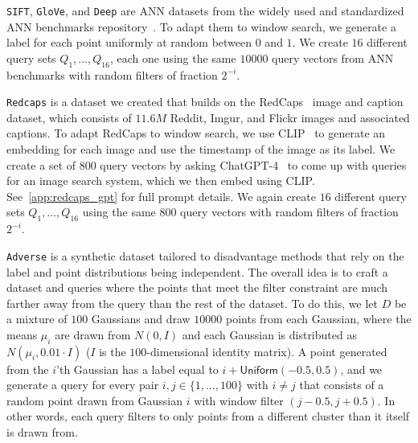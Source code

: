 \documentclass{article}
\theoremstyle{plain}
\theoremstyle{definition}
\theoremstyle{remark}
\newcommand{\datasetname}[1]{\texttt{#1}}
\begin{document}
\begin{list}{\textbullet}{%
    \setlength{\leftmargin}{0.5em}
    \setlength{\itemindent}{0em}
    \setlength{\labelwidth}{\itemindent}
    \setlength{\labelsep}{0.5em}
    \setlength{\listparindent}{1em}
    \setlength{\itemsep}{0em}
    \setlength{\parsep}{0em}
    \setlength{\topsep}{0em}
    \setlength{\partopsep}{0em}
}
    \item \datasetname{SIFT}, \datasetname{GloVe}, and \datasetname{Deep} are ANN datasets from the widely used and standardized ANN benchmarks repository~\cite{aumuller2020ann}. To adapt them to window search, we generate a label for each point uniformly at random between $0$ and $1$. We create $16$ different query sets $Q_1, \ldots, Q_{16}$, each one using the same $10000$ query vectors from ANN benchmarks with random filters of fraction $2^{-i}$. 

    \item \datasetname{Redcaps} is a dataset we created that builds on the RedCaps~\cite{desai2021redcaps} image and caption dataset, which consists of  $11.6M$ Reddit, Imgur, and Flickr images and associated captions. To adapt RedCaps to window search, we use CLIP~\cite{radford2021learning} to generate an embedding for each image and use the timestamp of the image as its label. We create a set of $800$ query vectors by asking ChatGPT-4~\cite{achiam2023gpt} to come up with queries for an image search system, which we then embed using CLIP. See~\cref{app:redcaps_gpt} for full prompt details. We again create $16$ different query sets $Q_1, \ldots, Q_{16}$ using the same $800$ query vectors with random filters of fraction $2^{-i}$. 

    \item \datasetname{Adverse} is a synthetic dataset tailored to disadvantage methods that rely on the label and point distributions being independent. The overall idea is to craft a dataset and queries where the points that meet the filter constraint are much farther away from the query than the rest of the dataset. To do this, we let $D$ be a mixture of $100$ Gaussians and draw $10000$ points from each Gaussian, where the means $\mu_i$ are drawn from $N(0, I)$ and each Gaussian is distributed as $N(\mu_i, 0.01 \cdot I)$ ($I$ is the $100$-dimensional identity matrix). A point generated from the $i$'th Gaussian has a label equal to $i + \mathsf{Uniform}(-0.5, 0.5)$, and we generate a query for every pair $i, j \in \{1,\ldots,100\}$ with $i \ne j$ that consists of a random point drawn from Gaussian $i$ with window filter $(j - 0.5, j + 0.5)$. In other words, each query filters to only points from a different cluster than it itself is drawn from.

\end{list}
\end{document}
